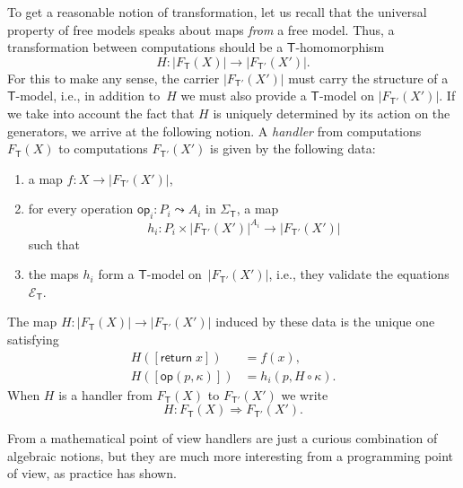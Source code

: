 \documentclass{amsart}
\newcommand{\theory}[1]{\mathsf{#1}} %
\newcommand{\signature}[1]{\Sigma_{\theory{#1}}} %
\newcommand{\equations}[1]{\mathcal{E}_{\theory{#1}}} %
\newcommand{\carrier}[1]{|#1|} %
\newcommand{\Free}[2]{F_{\theory{#1}}(#2)} %
\newcommand{\op}[1]{\mathsf{op}_{#1}} %
\newcommand{\opdecl}[3]{#1 : #2 \leadsto #3} %
\newcommand{\hto}{\Rightarrow} %
\newcommand{\kode}[1]{\mathsf{#1}}
\newcommand{\opcall}[3]{\kode{#1}(#2, #3)}
\newcommand{\return}[1]{\kode{return}\;#1}
\begin{document}
To get a reasonable notion of transformation, let us recall that the universal
property of free models speaks about maps \emph{from} a free model. Thus, a
transformation between computations should be a $\theory{T}$-homomorphism
%
\begin{equation*}
  H : \carrier{\Free{T}{X}} \longrightarrow \carrier{\Free{T'}{X'}}.
\end{equation*}
%
For this to make any sense, the carrier $\carrier{\Free{T'}{X'}}$ must carry the
structure of a $\theory{T}$-model, i.e., in addition to~$H$ we must also provide
a $\theory{T}$-model on $\carrier{\Free{T'}{X'}}$. If we take into account the
fact that $H$ is uniquely determined by its action on the generators, we arrive
at the following notion. A \emph{handler} from computations $\Free{T}{X}$ to
computations $\Free{T'}{X'}$ is given by the following data:
%
\begin{enumerate}
\item a map $f : X \to \carrier{\Free{T'}{X'}}$,
\item for every operation $\opdecl{\op{i}}{P_i}{A_i}$ in $\signature{T}$, a map
  \begin{equation*}
    h_i : P_i \times \carrier{\Free{T'}{X'}}^{A_i} \to \carrier{\Free{T'}{X'}}
  \end{equation*}
  such that
\item the maps $h_i$ form a $\theory{T}$-model on~$\carrier{\Free{T'}{X'}}$, i.e., they
 validate the equations~$\equations{T}$.
\end{enumerate}
%
The map $H : \carrier{\Free{T}{X}} \longrightarrow \carrier{\Free{T'}{X'}}$ induced by these
data is the unique one satisfying
%
\begin{align*}
  H([\return{x}]) &= f(x), \\
  H([\opcall{op}{p}{\kappa}]) &= h_i(p, H \circ \kappa).
\end{align*}
%
When $H$ is a handler from $\Free{T}{X}$ to $\Free{T'}{X'}$ we write
%
\begin{equation*}
  H : \Free{T}{X} \hto \Free{T'}{X'}.
\end{equation*}


From a mathematical point of view handlers are just a curious
combination of algebraic notions, but they are much more interesting from a
programming point of view, as practice has shown.
\end{document}

